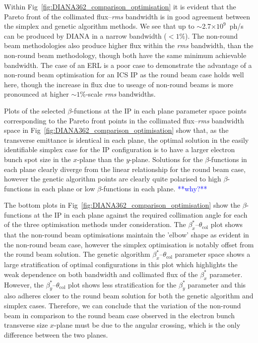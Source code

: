 \documentclass[../main.tex]{subfiles}
\begin{document}
Within Fig~\ref{fig:DIANA362_comparison_optimisation} it is evident that the Pareto front of the collimated flux--\textit{rms} bandwidth is in good agreement between the simplex and genetic algorithm methods. We see that up to $\sim$2.7$\times 10^{9}$~ph/\si{\second} can be produced by DIANA in a narrow bandwidth ($<1$\%). The non-round beam methodologies also produce higher flux within the \textit{rms} bandwidth, than the non-round beam methodology, though both have the same minimum achievable bandwidth. The case of an ERL is a poor case to demonstrate the advantage of a non-round beam optimisation for an ICS IP as the round beam case holds well here, though the increase in flux due to useage of non-round beams is more pronounced at higher $\sim1$\%-scale \textit{rms} bandwidths. 

Plots of the selected $\beta$-functions at the IP in each plane parameter space points corresponding to the Pareto front points in the collimated flux--\textit{rms} bandwidth space in Fig~\ref{fig:DIANA362_comparison_optimisation} show that, as the transverse emittance is identical in each plane, the optimal solution in the easily identifiable simplex case for the IP configuration is to have a larger electron bunch spot size in the $x$-plane than the $y$-plane. Solutions for the $\beta$-functions in each plane clearly diverge from the linear relationship for the round beam case, however the genetic algorithm points are clearly quite polarised to high $\beta$-functions in each plane or low $\beta$-functions in each plane. \textcolor{blue}{**why?**} 

The bottom plots in Fig~\ref{fig:DIANA362_comparison_optimisation} show the $\beta$-functions at the IP in each plane against the required collimation angle for each of the three optimisation methods under consideration. The $\beta_{x}^{*}$--$\theta_{\mathrm{col}}$ plot shows that the non-round beam optimisations maintain the 'elbow' shape as evident in the non-round beam case, however the simplex optimisation is notably offset from the round beam solution. The genetic algorithm $\beta_{x}^{*}$--$\theta_{\mathrm{col}}$ parameter space shows a large stratification of optimal configurations in this plot which highlights the weak dependence on both bandwidth and collimated flux of the $\beta_{x}^{*}$ parameter. However, the $\beta_{y}^{*}$--$\theta_{\mathrm{col}}$ plot shows less stratification for the $\beta_{y}^{*}$ parameter and this also adheres closer to the round beam solution for both the genetic algorithm and simplex cases. Therefore, we can conclude that the variation of the non-round beam in comparison to the round beam case observed in the electron bunch transverse size $x$-plane must be due to the angular crossing, which is the only difference between the two planes.   
\end{document}
